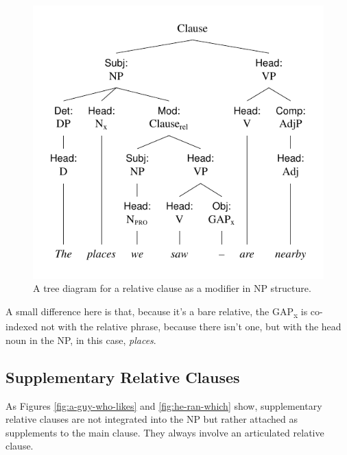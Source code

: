 \begin{figure}[ht]
    \centering
    \includegraphics{figures/the-places-we-saw.pdf}
    \caption{A tree diagram for a relative clause as a modifier in NP structure.}
    \label{fig:the-places-we-saw}
\end{figure}

A small difference here is that, because it's a bare relative, the GAP\textsubscript{x} is co-indexed not with the relative phrase, because there isn't one, but with the head noun in the NP, in this case, \textit{places}.

\subsection{Supplementary Relative Clauses}
As Figures \ref{fig:a-guy-who-likes} and \ref{fig:he-ran-which} show, supplementary relative clauses are not integrated into the NP but rather attached as supplements to the main clause. They always involve an articulated relative clause.

